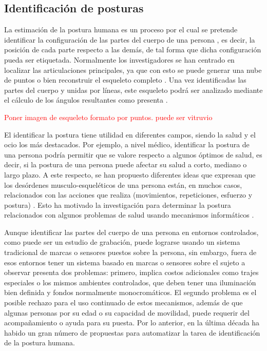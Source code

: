     \subsection{Identificación de posturas}
    \label{sub:FramePoseEstimation}
        La estimación de la postura humana es un proceso por el cual se pretende identificar la configuración de las partes del cuerpo de una persona \cite{Poppe2007}, es decir, la posición de cada parte respecto a las demás, de tal forma que dicha configuración pueda ser etiquetada. Normalmente los investigadores se han centrado en localizar las articulaciones principales, ya que con esto se puede generar una nube de puntos o bien reconstruir el esqueleto completo \cite{Rojas-Albarracin2010}. Una vez identificadas las partes del cuerpo y unidas por líneas, este esqueleto podrá ser analizado mediante el cálculo de los ángulos resultantes como presenta \cite{Rojas-Albarracin2009}.
        
        \textcolor{red}{Poner imagen de esqueleto formato por puntos. puede ser vitruvio}
        
        El identificar la postura tiene utilidad en diferentes campos, siendo la salud y el ocio los más destacados. Por ejemplo, a nivel médico, identificar la postura de una persona podría permitir que se valore respecto a algunos óptimos de salud, es decir, si la postura de una persona puede afectar su salud a corto, mediano o largo plazo. A este respecto, se han propuesto diferentes ideas que expresan que los desórdenes musculo-esqueléticos de una persona están, en muchos casos, relacionados con las acciones que realiza (movimientos, repeticiones, esfuerzo y postura) \cite{Karsh2006}. Esto ha motivado la investigación para determinar la postura relacionados con algunos problemas de salud usando mecanismos informáticos \cite{Balista2010, Bianch2006}.
        
        Aunque identificar las partes del cuerpo de una persona en entornos controlados, como puede ser un estudio de grabación, puede lograrse usando un sistema tradicional de marcas o sensores puestos sobre la persona, sin embargo, fuera de esos entornos tener un sistema basado en marcas o sensores sobre el sujeto a observar presenta dos problemas: primero, implica costos adicionales como trajes especiales o los mismos ambientes controlados, que deben tener una iluminación bien definida y fondos normalmente monocromáticos. El segundo problema es el posible rechazo para el uso continuado de estos mecanismos, además de que algunas personas por su edad o su capacidad de movilidad, puede requerir del acompañamiento o ayuda para su puesta. Por lo anterior, en la última década ha habido un gran número de propuestas para automatizar la tarea de identificación de la postura humana.

